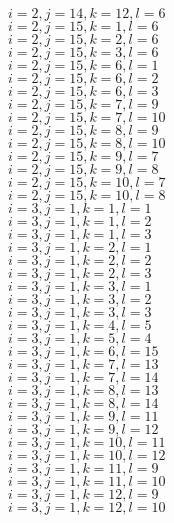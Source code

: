 \documentclass[14pt]{article}
\begin{document}
    $i=2,j=14,k=12,l=6 $ \\ 
    $i=2,j=15,k=1,l=6 $ \\ 
    $i=2,j=15,k=2,l=6 $ \\ 
    $i=2,j=15,k=3,l=6 $ \\ 
    $i=2,j=15,k=6,l=1 $ \\ 
    $i=2,j=15,k=6,l=2 $ \\ 
    $i=2,j=15,k=6,l=3 $ \\ 
    $i=2,j=15,k=7,l=9 $ \\ 
    $i=2,j=15,k=7,l=10 $ \\ 
    $i=2,j=15,k=8,l=9 $ \\ 
    $i=2,j=15,k=8,l=10 $ \\ 
    $i=2,j=15,k=9,l=7 $ \\ 
    $i=2,j=15,k=9,l=8 $ \\ 
    $i=2,j=15,k=10,l=7 $ \\ 
    $i=2,j=15,k=10,l=8 $ \\ 
    $i=3,j=1,k=1,l=1 $ \\ 
    $i=3,j=1,k=1,l=2 $ \\ 
    $i=3,j=1,k=1,l=3 $ \\ 
    $i=3,j=1,k=2,l=1 $ \\ 
    $i=3,j=1,k=2,l=2 $ \\ 
    $i=3,j=1,k=2,l=3 $ \\ 
    $i=3,j=1,k=3,l=1 $ \\ 
    $i=3,j=1,k=3,l=2 $ \\ 
    $i=3,j=1,k=3,l=3 $ \\ 
    $i=3,j=1,k=4,l=5 $ \\ 
    $i=3,j=1,k=5,l=4 $ \\ 
    $i=3,j=1,k=6,l=15 $ \\ 
    $i=3,j=1,k=7,l=13 $ \\ 
    $i=3,j=1,k=7,l=14 $ \\ 
    $i=3,j=1,k=8,l=13 $ \\ 
    $i=3,j=1,k=8,l=14 $ \\ 
    $i=3,j=1,k=9,l=11 $ \\ 
    $i=3,j=1,k=9,l=12 $ \\ 
    $i=3,j=1,k=10,l=11 $ \\ 
    $i=3,j=1,k=10,l=12 $ \\ 
    $i=3,j=1,k=11,l=9 $ \\ 
    $i=3,j=1,k=11,l=10 $ \\ 
    $i=3,j=1,k=12,l=9 $ \\ 
    $i=3,j=1,k=12,l=10 $ \\ 
\end{document}
